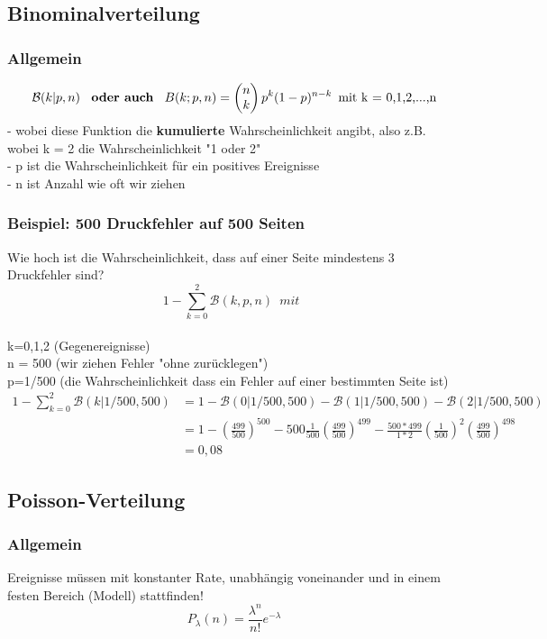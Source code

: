 \documentclass{article}
\begin{document}
\subsection{Binominalverteilung}
\subsubsection{Allgemein}
\[
	\mathcal{B}(k | p,n) \enspace \textbf{ oder auch } \enspace B(k;p,n) =
\begin{pmatrix} n \\ k \end{pmatrix} p^k(1-p)^{n-k} \enspace \newline
\text{mit k = 0,1,2,...,n} \]
- wobei diese Funktion die \textbf{kumulierte} Wahrscheinlichkeit angibt, also z.B.
wobei k = 2 die Wahrscheinlichkeit "1 oder 2"
\\ - p ist die Wahrscheinlichkeit f\"ur ein positives Ereignisse
\\ - n ist Anzahl wie oft wir ziehen

\subsubsection{Beispiel: 500 Druckfehler auf 500 Seiten}
Wie hoch ist die Wahrscheinlichkeit, dass auf einer Seite mindestens 3 Druckfehler
sind?
\[
1- \sum_{k=0}^{2} \mathcal{B}(k,p,n) \enspace mit \enspace \] \\
k=0,1,2 (Gegenereignisse)\\ n = 500
(wir ziehen Fehler "ohne zur\"ucklegen") \\ p=1/500 (die Wahrscheinlichkeit dass
ein Fehler auf einer bestimmten Seite ist)\\
\begin{equation*}
	\begin{split}
		1- \sum_{k=0}^{2} \mathcal{B}(k|1/500,500)
		& = 1 - \mathcal{B}(0|1/500,500) - \mathcal{B}(1|1/500,500) - \mathcal{B}(2|1/500,500) \\
		& = 1 - \left( \frac{499}{500} \right) ^{500} - 500\frac{1}{500}\left(\frac{499}{500}\right)^{499} - \frac{500*499}{1*2}\left( \frac{1}{500} \right) ^2 \left( \frac{499}{500} \right) ^{498} \\ & = 0,08
	\end{split}
\end{equation*}
\subsection{Poisson-Verteilung}
\subsubsection{Allgemein}
Ereignisse m\"ussen mit konstanter Rate, unabh\"angig voneinander und in einem festen 
Bereich (Modell) stattfinden!
\[
	P_{\lambda}(n) = \frac{\lambda ^n}{n!} e ^{- \lambda}
\]
\end{document}
